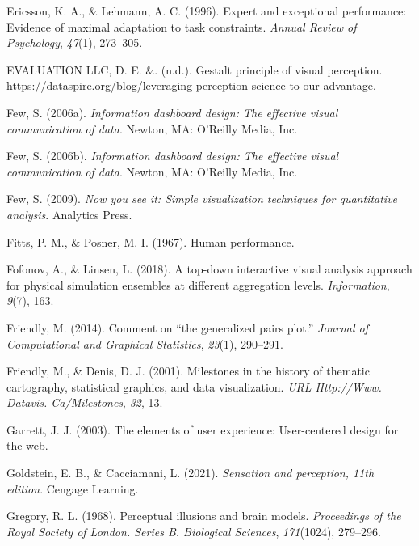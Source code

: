 \documentclass[print]{nuthesis}
\newlength{\cslhangindent}
\newenvironment{CSLReferences}[2]%
{\setlength{\parindent}{0pt}%
\everypar{\setlength{\hangindent}{\cslhangindent}}\ignorespaces}%
{\par}
\begin{document}
\begin{CSLReferences}{1}{0}
\leavevmode{}%
Ericsson, K. A., \& Lehmann, A. C. (1996). Expert and exceptional performance: Evidence of maximal adaptation to task constraints. \emph{Annual Review of Psychology}, \emph{47}(1), 273--305.

\leavevmode{}%
EVALUATION LLC, D. E. \&. (n.d.). Gestalt principle of visual perception. \url{https://dataspire.org/blog/leveraging-perception-science-to-our-advantage}.

\leavevmode{}%
Few, S. (2006a). \emph{Information dashboard design: The effective visual communication of data}. Newton, MA: O'Reilly Media, Inc.

\leavevmode{}%
Few, S. (2006b). \emph{Information dashboard design: The effective visual communication of data}. Newton, MA: O'Reilly Media, Inc.

\leavevmode{}%
Few, S. (2009). \emph{Now you see it: Simple visualization techniques for quantitative analysis}. Analytics Press.

\leavevmode{}%
Fitts, P. M., \& Posner, M. I. (1967). Human performance.

\leavevmode{}%
Fofonov, A., \& Linsen, L. (2018). A top-down interactive visual analysis approach for physical simulation ensembles at different aggregation levels. \emph{Information}, \emph{9}(7), 163.

\leavevmode{}%
Friendly, M. (2014). Comment on {``the generalized pairs plot.''} \emph{Journal of Computational and Graphical Statistics}, \emph{23}(1), 290--291.

\leavevmode{}%
Friendly, M., \& Denis, D. J. (2001). Milestones in the history of thematic cartography, statistical graphics, and data visualization. \emph{URL Http://Www. Datavis. Ca/Milestones}, \emph{32}, 13.

\leavevmode{}%
Garrett, J. J. (2003). The elements of user experience: User-centered design for the web.

\leavevmode{}%
Goldstein, E. B., \& Cacciamani, L. (2021). \emph{Sensation and perception, 11th edition}. Cengage Learning.

\leavevmode{}%
Gregory, R. L. (1968). Perceptual illusions and brain models. \emph{Proceedings of the Royal Society of London. Series B. Biological Sciences}, \emph{171}(1024), 279--296.


\end{CSLReferences}
\end{document}
